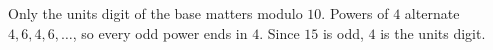 Only the units digit of the base matters modulo $10$. Powers of $4$ alternate $4,6,4,6,\ldots$, so every odd power ends in $4$. Since $15$ is odd, $\boxed{4}$ is the units digit.
